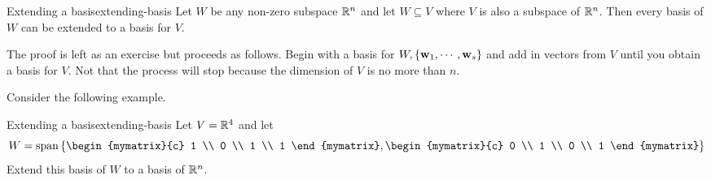 \begin{theorem}{Extending a basis}{extending-basis}
Let $W$ be any non-zero subspace $\mathbb{R}^{n}$ and let $W\subseteq V$
where $V$ is also a subspace of $\mathbb{R}^{n}$. Then every basis of $W$
can be extended to a basis for $V$.
\end{theorem}

The proof is left as an exercise but proceeds as follows. Begin with a basis for $W,\left\{\mbox{\bf w}_{1},\cdots ,\mbox{\bf w}_{s}\right\} $ and add in vectors from $V$ until you obtain a basis for $V$.
Not that the process will stop because the dimension of $V$ is no more than $n$. 

Consider the following example.

\begin{example}{Extending a basis}{extending-basis}
Let $V=\mathbb{R}^{4}$ and let 
\begin{equation*}
W=\sspan\set{\begin{mymatrix}{c}
1 \\ 
0 \\ 
1 \\ 
1
\end{mymatrix} ,\begin{mymatrix}{c}
0 \\ 
1 \\ 
0 \\ 
1
\end{mymatrix} }
\end{equation*}
Extend this basis of $W$ to a basis of $\mathbb{R}^{n}$.
\end{example}

